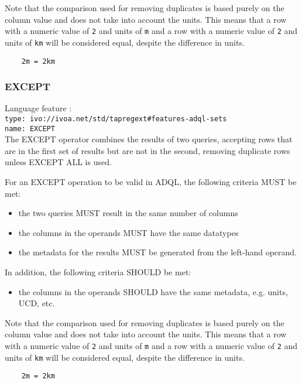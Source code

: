 \documentclass[11pt,a4paper]{ivoa}
\begin{document}
Note that the comparison used for removing duplicates is based purely on the
column value and does not take into account the units.
This means that a row with a numeric value of \verb:2: and units of \verb:m:
and a row with a numeric value of \verb:2: and units of \verb:km: will be
considered equal, despite the difference in units.
\begin{verbatim}
    2m = 2km
\end{verbatim}

\subsubsection{EXCEPT}
{\footnotesize Language feature :}\\
{\footnotesize \verb|type: ivo://ivoa.net/std/tapregext#features-adql-sets|}\\
{\footnotesize \verb|name: EXCEPT|}\\

The EXCEPT operator combines the results of two queries, accepting rows that are
in the first set of results but are not in the second,
removing duplicate rows unless EXCEPT ALL is used.

For an EXCEPT operation to be valid in ADQL, the following criteria MUST be met:

\begin{itemize}
    \item the two queries MUST result in the same number of columns
    \item the columns in the operands MUST have the same datatypes
    \item the metadata for the results MUST be generated from the left-hand operand.
\end{itemize}

In addition, the following criteria SHOULD be met:
\begin{itemize}
    \item the columns in the operands SHOULD have the same metadata, e.g. units, UCD, etc.
\end{itemize}

Note that the comparison used for removing duplicates is based purely on the
column value and does not take into account the units.
This means that a row with a numeric value of \verb:2: and units of \verb:m:
and a row with a numeric value of \verb:2: and units of \verb:km: will be
considered equal, despite the difference in units.
\begin{verbatim}
    2m = 2km
\end{verbatim}
\end{document}
